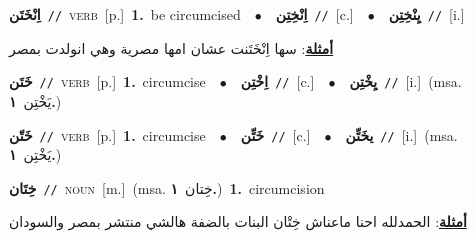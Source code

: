 \documentclass[10pt,a4paper,twoside]{article} %
\begin{document}
\begin{multicols}{2}
{\setlength\topsep{0pt}\textbf{\foreignlanguage{arabic}{اِنْخَتَن}}\ {\color{gray}\texttt{//}\color{black}}\ \textsc{verb}\ [p.]\ \textbf{1.}~be circumcised\ \ $\bullet$\ \ \setlength\topsep{0pt}\textbf{\foreignlanguage{arabic}{اِنْخِتِن}}\ {\color{gray}\texttt{//}\color{black}}\ [c.]\ \ $\bullet$\ \ \setlength\topsep{0pt}\textbf{\foreignlanguage{arabic}{يِنْخِتِن}}\ {\color{gray}\texttt{//}\color{black}}\ [i.]\  \begin{flushright}\color{gray}\foreignlanguage{arabic}{\textbf{\underline{\foreignlanguage{arabic}{أمثلة}}}: سها اِنْخَتَنت عشان امها مصرية وهي انولدت بمصر}\end{flushright}\color{black}} \vspace{2mm}

{\setlength\topsep{0pt}\textbf{\foreignlanguage{arabic}{خَتَن}}\ {\color{gray}\texttt{//}\color{black}}\ \textsc{verb}\ [p.]\ \textbf{1.}~circumcise\ \ $\bullet$\ \ \setlength\topsep{0pt}\textbf{\foreignlanguage{arabic}{اِخْتِن}}\ {\color{gray}\texttt{//}\color{black}}\ [c.]\ \ $\bullet$\ \ \setlength\topsep{0pt}\textbf{\foreignlanguage{arabic}{يِخْتِن}}\ {\color{gray}\texttt{//}\color{black}}\ [i.]\ \color{gray}(msa. \foreignlanguage{arabic}{يَخْتِن}~\foreignlanguage{arabic}{\textbf{١.}})\color{black}\ } \vspace{2mm}

{\setlength\topsep{0pt}\textbf{\foreignlanguage{arabic}{خَتّن}}\ {\color{gray}\texttt{//}\color{black}}\ \textsc{verb}\ [p.]\ \textbf{1.}~circumcise\ \ $\bullet$\ \ \setlength\topsep{0pt}\textbf{\foreignlanguage{arabic}{خَتِّن}}\ {\color{gray}\texttt{//}\color{black}}\ [c.]\ \ $\bullet$\ \ \setlength\topsep{0pt}\textbf{\foreignlanguage{arabic}{يخَتِّن}}\ {\color{gray}\texttt{//}\color{black}}\ [i.]\ \color{gray}(msa. \foreignlanguage{arabic}{يَخْتِن}~\foreignlanguage{arabic}{\textbf{١.}})\color{black}\ } \vspace{2mm}

{\setlength\topsep{0pt}\textbf{\foreignlanguage{arabic}{خِتَان}}\ {\color{gray}\texttt{//}\color{black}}\ \textsc{noun}\ [m.]\ \color{gray}(msa. \foreignlanguage{arabic}{خِتان}~\foreignlanguage{arabic}{\textbf{١.}})\color{black}\ \textbf{1.}~circumcision\  \begin{flushright}\color{gray}\foreignlanguage{arabic}{\textbf{\underline{\foreignlanguage{arabic}{أمثلة}}}: الحمدلله احنا ماعناش خِتْان البنات بالضفة هالشي منتشر بمصر والسودان}\end{flushright}\color{black}} \vspace{2mm}


\end{multicols}
\end{document}
